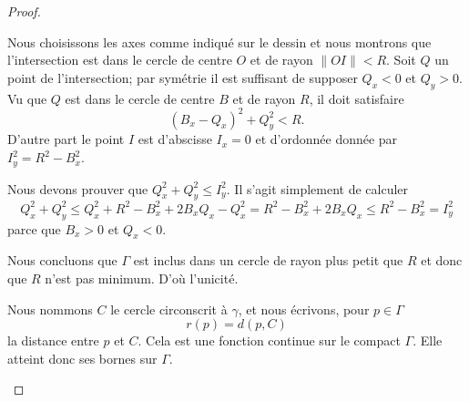 \begin{proof}
\begin{subproof}
		\begin{center}
			
		\end{center}

		Nous choisissons les axes comme indiqué sur le dessin et nous montrons que l'intersection est dans le cercle de centre \( O\) et de rayon \( \| OI \|<R\). Soit \( Q\) un point de l'intersection; par symétrie il est suffisant de supposer \( Q_x<0\) et \( Q_y>0\). Vu que \( Q\) est dans le cercle de centre \( B\) et de rayon \( R\), il doit satisfaire
		\begin{equation}
			(B_x-Q_x)^2+Q_{y}^2<R.
		\end{equation}
		D'autre part le point \( I\) est d'abscisse \( I_x=0\) et d'ordonnée donnée par \( I_y^2=R^2-B_x^2\).

		Nous devons prouver que \( Q_x^2+Q_y^2\leq I_y^2\). Il s'agit simplement de calculer
		\begin{equation}
			Q_x^2+Q_y^2\leq Q_x^2+R^2-B_x^2+2B_xQ_x-Q_x^2=R^2-B_x^2+2B_xQ_x\leq R^2-B_x^2=I_y^2
		\end{equation}
		parce que \( B_x>0\) et \( Q_x<0\).

		Nous concluons que \( \Gamma\) est inclus dans un cercle de rayon plus petit que \( R\) et donc que \( R\) n'est pas minimum. D'où l'unicité.


		Nous nommons \( C\) le cercle circonscrit à \( \gamma\), et nous écrivons, pour \( p\in \Gamma\)
		\begin{equation}
			r(p)=d(p,C)
		\end{equation}
		la distance entre \( p\) et \( C\). Cela est une fonction continue sur le compact \( \Gamma\). Elle atteint donc ses bornes sur \( \Gamma\).
		\begin{subproof}


\end{subproof}
\end{subproof}
\end{proof}
